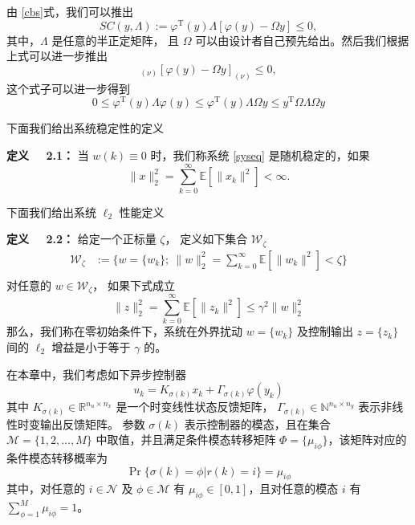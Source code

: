 	由 \eqref{cbs}式，我们可以推出
	\begin{equation}\label{scieq}
	SC(y,\varLambda):= \varphi^{\mathrm{T}}(y)\varLambda[\varphi(y)-\varOmega y]\leq0,
	\end{equation}
	其中，$\varLambda$ 是任意的半正定矩阵， 且 $\varOmega$ 可以由设计者自己预先给出。然后我们根据上式可以进一步推出
	\begin{equation}
	[\varOmega y]_{(\nu)}[\varphi(y)-\varOmega y]_{(\nu)}\leq0,
	\end{equation}
	这个式子可以进一步得到
	\begin{equation}
	0\leq\varphi^{\mathrm{T}}(y)\varLambda\varphi(y) \leq \varphi^{\mathrm{T}}(y)\varLambda\varOmega y \leq y^{\mathrm{T}}\varOmega\varLambda\varOmega y
	\end{equation}
	
	下面我们给出系统稳定性的定义
	
	{\bf 定义 \ \ 2.1：} 
	当 $w(k)\equiv0$ 时，我们称系统 \eqref{syseq} 是随机稳定的，如果
	\begin{equation}
	\|x\|^2_2=\sum_{k=0}^{\infty}\mathbb{E}[\|x_k\|^2]<\infty.
	\end{equation} 
	
	下面我们给出系统 $\ell_2$ 性能定义
	
	{\bf 定义 \ \ 2.2：}
	给定一个正标量 $\zeta$， 定义如下集合 $\mathcal{W}_{\zeta} $ 	
	\begin{equation}
		\begin{split}
			\mathcal{W}_{\zeta}&:=\Big\{ w=\{w_k\}; \   \|w\|^2_2=\sum_{k=0}^{\infty}\mathbb{E}[\|w_k\|^{2}]<\zeta\Big\}\\
		\end{split}
	\end{equation}
	对任意的  $w\in\mathcal{W}_{\zeta}$， 如果下式成立
	\begin{equation}
		\|z\|^2_2=\sum_{k=0}^{\infty}\mathbb{E}\left[\|z_k\|^2\right] \leq \gamma^{2}\|w\|^2_2
	\end{equation}
	那么，我们称在零初始条件下，系统在外界扰动 $w=\{w_k\}$ 及控制输出 $z=\{z_k\}$ 间的 $\ell_2$ 增益是小于等于 $\gamma$ 的。
	
	在本章中，我们考虑如下异步控制器
	\begin{equation}\label{asycontroller}
	u_k=K_{\sigma(k)}x_k+\varGamma_{\sigma(k)}\varphi(y_k) 
	\end{equation}
	其中 $K_{\sigma(k)}\in \mathbb{R}^{n_u\times n_x}$ 是一个时变线性状态反馈矩阵， $\varGamma_{\sigma(k)}\in \mathbb{N}^{n_u\times n_y}$ 表示非线性时变输出反馈矩阵。 参数 $\sigma(k)$ 表示控制器的模态，且在集合  $\mathcal{M}=\{1,2,\dots,M\}$ 中取值，并且满足条件模态转移矩阵 $\varPhi=\{\mu_{i\phi} \}$，该矩阵对应的条件模态转移概率为
	\begin{equation}
	\Pr\{\sigma(k)=\phi|r(k)=i\}=\mu_{i\phi}
	\end{equation}
	其中，对任意的 $i\in\mathcal{N}$ 及 $\phi\in\mathcal{M}$ 有 $\mu_{i\phi}\in [0,1]$，且对任意的模态 $i$ 有 $\sum_{\phi=1}^{M}\mu_{i\phi}=1$。
	
